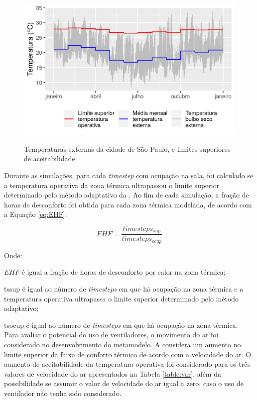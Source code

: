 \documentclass[brazil,hardcopy,openany]{ufscthesis} %
\begin{document}
\begin{figure}[H]
	\centering
	\caption{Temperaturas externas da cidade de São Paulo, e limites superiores de aceitabilidade}
	\includegraphics[width=.8\linewidth]{img/temp_means.png}
	\label{fig:temp_means}
\end{figure}

Durante as simulações, para cada \textit{timestep} com ocupação na sala, foi calculado se a temperatura operativa da zona térmica ultrapassou o limite superior determinado pelo método adaptativo da . Ao fim de cada simulação, a fração de horas de desconforto foi obtida para cada zona térmica modelada, de acordo com a Equação \ref{eq:EHF}:

\begin{equation}
\label{eq:EHF}
EHF = \frac{timesteps_{sup}}{timesteps_{ocup}}
\end{equation}

Onde:

$EHF$ é igual a fração de horas de desconforto por calor na zona térmica;

\gls{tssup} é igual ao número de \textit{timesteps} em que há ocupação na zona térmica e a temperatura operativa ultrapassa o limite superior determinado pelo método adaptativo;

\gls{tsocup} é igual ao número de \textit{timesteps} em que há ocupação na zona térmica.
\\

Para avaliar o potencial do uso de ventiladores, o movimento do ar foi considerado no desenvolvimento do metamodelo.
A  considera um aumento no limite superior da faixa de conforto térmico de acordo com a velocidade do ar.
O aumento de aceitabilidade da temperatura operativa foi considerado para os três valores de velocidade do ar apresentados na Tabela \ref{table:var}, além da possibilidade se assumir o valor de velocidade do ar igual a zero, caso o uso de ventilador não tenha sido considerado.
\end{document}
